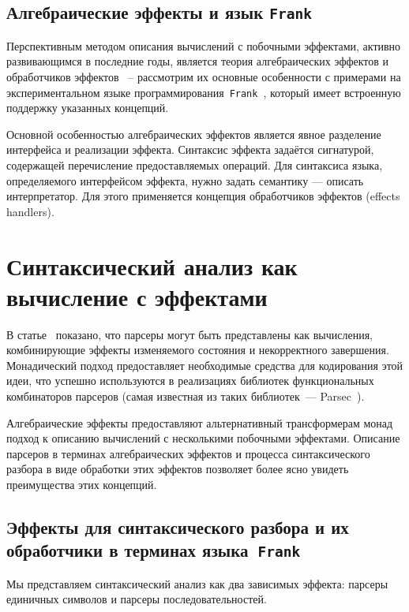 \documentclass [a4paper] {article}
\begin{document}
\subsection{Алгебраические эффекты и язык \texttt{Frank}}

Перспективным методом описания вычислений с побочными эффектами, активно
развивающимся в последние годы, является теория алгебраических
эффектов и обработчиков эффектов~\cite{AlgEffects} -- рассмотрим их основные особенности с примерами на экспериментальном языке
программирования~\texttt{Frank}~\cite{Frank}, который имеет встроенную
поддержку указанных концепций.

Основной особенностью алгебраических эффектов является явное разделение
интерфейса и реализации эффекта. Синтаксис эффекта задаётся сигнатурой,
содержащей перечисление предоставляемых операций. Для синтаксиса языка,
определяемого интерфейсом эффекта, нужно задать
семантику --- описать интерпретатор. Для этого применяется концепция
обработчиков эффектов (effects handlers).

\section{Синтаксический анализ как вычисление с эффектами}

В статье~\cite{monParsing} показано, что парсеры могут быть представлены как вычисления, комбинирующие эффекты изменяемого состояния и некорректного завершения. Монадический подход предоставляет
необходимые средства для кодирования этой идеи, что успешно используются в реализациях библиотек
функциональных комбинаторов парсеров (самая известная из таких библиотек~--- Parsec~\cite{parsec}).

Алгебраические эффекты предоставляют альтернативный трансформерам монад подход к
описанию вычислений с несколькими побочными эффектами. Описание парсеров в
терминах алгебраических эффектов и процесса синтаксического разбора в виде
обработки этих эффектов позволяет более ясно увидеть преимущества этих концепций.

\subsection{Эффекты для синтаксического разбора и их обработчики
            в терминах языка~\texttt{Frank}}

Мы представляем синтаксический анализ
как два зависимых эффекта: парсеры единичных символов и парсеры
последовательностей.
\end{document}
